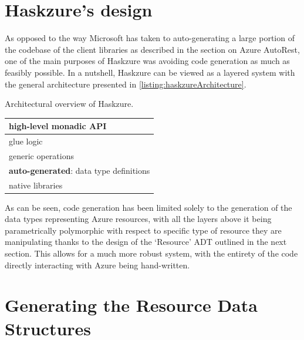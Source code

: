 \documentclass[11pt]{report}
\begin{document}
\section{Haskzure's design}

As opposed to the way Microsoft has taken to auto-generating a large portion of
the codebase of the client libraries as described in the section on Azure
AutoRest, one of the main purposes of Haskzure was avoiding code generation
as much as feasibly possible. \newline
In a nutshell, Haskzure can be viewed as a layered system with the general
architecture presented in \autoref{listing:haskzureArchitecture}.

\begin{listing}[H]
\caption{Architectural overview of Haskzure.}
\label{listing:haskzureArchitecture}
\begin{center}
    \begin{tabular}{ | p{7.5cm} | }
        \hline
        high-level monadic API \\ \hline
        glue logic \\ \hline
        generic operations \\ \hline
        \textbf{auto-generated}: data type definitions \\ \hline
        native libraries \\ \hline
    \end{tabular}
\end{center}
\end{listing}

As can be seen, code generation has been limited solely to the generation of
the data types representing Azure resources, with all the layers above it being
parametrically polymorphic with respect to specific type of resource they are
manipulating thanks to the design of the `Resource' ADT outlined in the next
section. This allows for a much more robust system, with the entirety of the
code directly interacting with Azure being hand-written.

\section{Generating the Resource Data Structures} %
\end{document}
